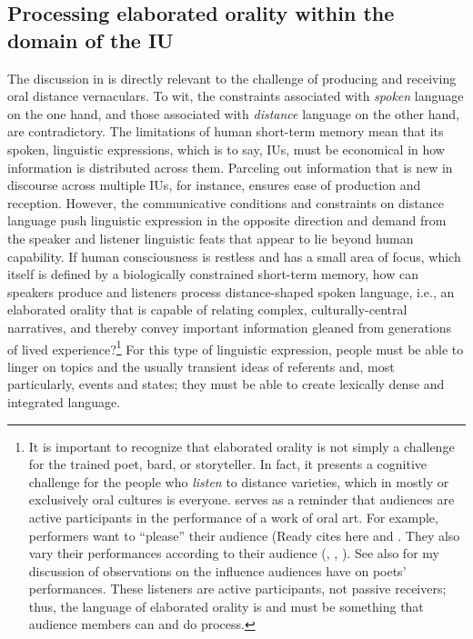 \subsection{Processing elaborated orality within the domain of the IU}\label{sec:6.1.2}

The discussion in  is directly relevant to the challenge of producing and receiving oral distance vernaculars. To wit, the constraints associated with \textit{spoken} language on the one hand, and those associated with \textit{distance} language on the other hand, are contradictory. The limitations of human short-term memory mean that its spoken, linguistic expressions, which is to say, IUs, must be economical in how information is distributed across them. Parceling out information that is new in discourse across multiple IUs, for instance, ensures ease of production and reception. However, the communicative conditions and constraints on distance language push linguistic expression in the opposite direction and demand from the speaker and listener linguistic feats that appear to lie beyond human capability. If human consciousness is restless and has a small area of focus, which itself is defined by a biologically constrained short-term memory, how can speakers produce and listeners process distance-shaped spoken language, i.e., an elaborated orality that is capable of relating complex, culturally-central narratives, and thereby convey important information gleaned from generations of lived experience?\footnote{{It is important to recognize that elaborated orality is not simply a challenge for the trained poet, bard, or storyteller. In fact, it presents a cognitive challenge for the people who} {\textit{listen}} {to distance varieties, which in mostly or exclusively oral cultures is everyone. \citet[134--135]{Ready2019} serves as a reminder that audiences are active participants in the performance of a work of oral art. For example, performers want to “please” their audience (Ready cites here \citealt[167]{Diop1995} and \citealt[126--127]{Jensen2011}. They also vary their performances according to their audience (\citealt[27]{Kaivola-Bregenhøj1996}, \citealt[132]{Jensen2011}, \citealt[66]{Okpewho2014}). See also  for my discussion of  observations on the influence audiences have on poets’ performances. These listeners are active participants, not passive receivers; thus, the language of elaborated orality is and must be something that audience members can and do process.} } For this type of linguistic expression, people must be able to linger on topics and the usually transient ideas of referents and, most particularly, events and states; they must be able to create lexically dense and integrated language.

